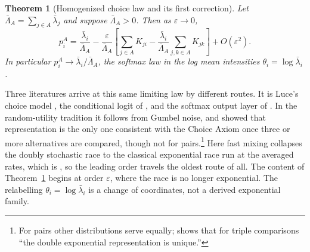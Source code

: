 \documentclass[11pt]{article}
\newtheorem{theorem}{Theorem}
\theoremstyle{remark}
\newcommand{\lbar}{\bar{\lambda}}
\begin{document}
\begin{theorem}[Homogenized choice law and its first correction]\label{thm:main}
Let $\bar\Lambda_A = \sum_{j\in A}\lbar_j$ and suppose $\bar\Lambda_A > 0$.
Then as $\varepsilon \to 0$,
\begin{equation}\label{eq:main}
  p_i^A
  = \frac{\lbar_i}{\bar\Lambda_A}
  - \frac{\varepsilon}{\bar\Lambda_A}
    \left[\sum_{j \in A} K_{ji}
      - \frac{\lbar_i}{\bar\Lambda_A}\sum_{j,k \in A} K_{jk}\right]
  + O(\varepsilon^2) .
\end{equation}
In particular $p_i^A \to \lbar_i / \bar\Lambda_A$, the softmax law in the
log mean intensities $\theta_i = \log\lbar_i$.
\end{theorem}

Three literatures arrive at this same limiting law by different routes. It is Luce's choice model
\citep{luce1959}, the conditional logit of \citet{mcfadden1974}, and the
softmax output layer of \citet{bridle1990}. In the random-utility tradition it
follows from Gumbel noise, and \citet{yellott1977} showed that representation
is the only one consistent with the Choice Axiom once three or more
alternatives are compared, though not for pairs.\footnote{For pairs other
distributions serve equally; \citet{yellott1977} shows that for triple
comparisons ``the double exponential representation is unique.''} Here fast mixing collapses the doubly stochastic race to the classical
exponential race run at the averaged rates, which is \citet{cox1959}, so the
leading order travels the oldest route of all. The content of
Theorem~\ref{thm:main} begins at order $\varepsilon$, where the race is no
longer exponential. The relabelling $\theta_i = \log\lbar_i$ is a change of
coordinates, not a derived exponential family.
\end{document}
